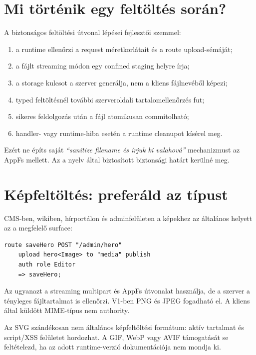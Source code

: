 \section{Mi történik egy feltöltés során?}

A biztonságos feltöltési útvonal lépései fejlesztői szemmel:

\begin{enumerate}
  \item a runtime ellenőrzi a request méretkorlátait és a route upload-sémáját;
  \item a fájlt streaming módon egy confined staging helyre írja;
  \item a storage kulcsot a szerver generálja, nem a kliens fájlnevéből képezi;
  \item typed feltöltésnél további szerveroldali tartalomellenőrzés fut;
  \item sikeres feldolgozás után a fájl atomikusan commitolható;
  \item handler- vagy runtime-hiba esetén a runtime cleanupot kísérel meg.
\end{enumerate}

Ezért ne építs saját \emph{``sanitize filename és írjuk ki valahová''} mechanizmust az AppFs mellett. Az a nyelv által biztosított biztonsági határt kerülné meg.

\section{Képfeltöltés: preferáld az  típust}

CMS-ben, wikiben, hírportálon és adminfelületen a képekhez az általános  helyett az  a megfelelő surface:

\begin{lstlisting}[language=RWLang]
route saveHero POST "/admin/hero"
    upload hero<Image> to "media" publish
    auth role Editor
    => saveHero;
\end{lstlisting}

Az  ugyanazt a streaming multipart és AppFs útvonalat használja, de a szerver a tényleges fájltartalmat is ellenőrzi. V1-ben PNG és JPEG fogadható el. A kliens által küldött MIME-típus nem authority.

Az SVG szándékosan nem általános képfeltöltési formátum: aktív tartalmat és script/XSS felületet hordozhat. A GIF, WebP vagy AVIF támogatását se feltételezd, ha az adott runtime-verzió dokumentációja nem mondja ki.

